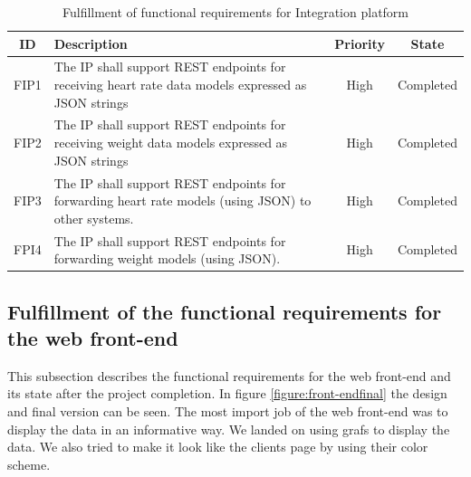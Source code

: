 \begin{table}[H]
\begin{center}
\begin{tabular}{ | c | p{9cm} | c | c | }
  \hline
  ID & Description & Priority & State\\
  \hline\noalign{\smallskip}\noalign{\smallskip}\hline
  FIP1	& The IP shall support REST endpoints for receiving heart rate data models expressed as JSON strings   & High & Completed\\
  FIP2	& The IP shall support REST endpoints for receiving weight data models expressed as JSON strings       & High & Completed \\
  FIP3	& The IP shall support REST endpoints for forwarding heart rate models (using JSON) to other systems.  & High & Completed \\
  FPI4	& The IP shall support REST endpoints for forwarding weight models (using JSON).                       & High & Completed \\
  \hline
\end{tabular}
\end{center}
\caption{Fulfillment of functional requirements for Integration platform}
\label{table:fulfillemntofrequirements}
\end{table}

\subsection{Fulfillment of the functional requirements for the web front-end}

This subsection describes the functional requirements for the web front-end and its state after the project completion. 
In figure \ref{figure:front-endfinal} the design and final version can be seen. 
The most import job of the web front-end was to display the data in an informative way.
We landed on using grafs to display the data. 
We also tried to make it look like the clients page by using their color scheme.

